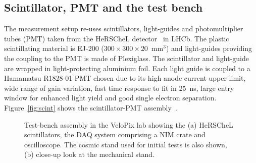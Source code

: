 \subsection{Scintillator, PMT and the test bench}
The measurement setup re-uses scintillators, light-guides and photomultiplier tubes (PMT) taken from the HeRSCheL detector~\cite{LHCb-DP-2016-003} in LHCb. The plastic scintillating material is EJ-200 ($300\times300\times20$~mm$^3$) and light-guides providing the coupling to the PMT is made of Plexiglass. The scintillator and light-guide are wrapped in light-protecting aluminium foil. Each light guide is coupled to a Hamamatsu R1828-01 PMT chosen due to its high anode current upper limit, wide range of gain variation, fast time response to fit in 25~ns, large entry window for enhanced light yield and good single electron separation. Figure~\ref{fig:scint} shows the scintillator-PMT assembly~\cite{LHCb-DP-2016-003}.


\begin{figure}
\centering
{}
\caption{\label{fig:test_bench} Test-bench assembly in the VeloPix lab showing the (a) HeRSCheL scintillators, the DAQ system comprising a NIM crate and oscilloscope. The cosmic stand used for initial tests is also shown, (b) close-up look at the mechanical stand.
}
\end{figure}

